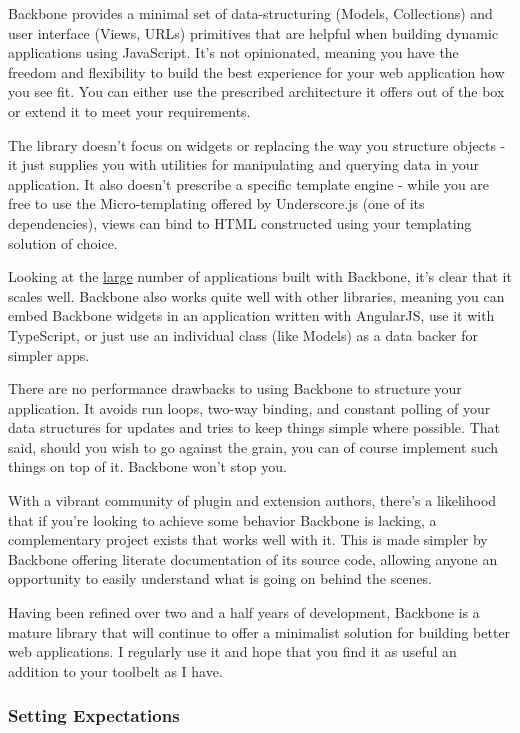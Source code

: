 \documentclass[9pt]{book}
\begin{document}
Backbone provides a minimal set of data-structuring (Models,
Collections) and user interface (Views, URLs) primitives that are
helpful when building dynamic applications using JavaScript. It's not
opinionated, meaning you have the freedom and flexibility to build the
best experience for your web application how you see fit. You can either
use the prescribed architecture it offers out of the box or extend it to
meet your requirements.

The library doesn't focus on widgets or replacing the way you structure
objects - it just supplies you with utilities for manipulating and
querying data in your application. It also doesn't prescribe a specific
template engine - while you are free to use the Micro-templating offered
by Underscore.js (one of its dependencies), views can bind to HTML
constructed using your templating solution of choice.

Looking at the \href{http://backbonejs.org/\#examples}{large} number of
applications built with Backbone, it's clear that it scales well.
Backbone also works quite well with other libraries, meaning you can
embed Backbone widgets in an application written with AngularJS, use it
with TypeScript, or just use an individual class (like Models) as a data
backer for simpler apps.

There are no performance drawbacks to using Backbone to structure your
application. It avoids run loops, two-way binding, and constant polling
of your data structures for updates and tries to keep things simple
where possible. That said, should you wish to go against the grain, you
can of course implement such things on top of it. Backbone won't stop
you.

With a vibrant community of plugin and extension authors, there's a
likelihood that if you're looking to achieve some behavior Backbone is
lacking, a complementary project exists that works well with it. This is
made simpler by Backbone offering literate documentation of its source
code, allowing anyone an opportunity to easily understand what is going
on behind the scenes.

Having been refined over two and a half years of development, Backbone
is a mature library that will continue to offer a minimalist solution
for building better web applications. I regularly use it and hope that
you find it as useful an addition to your toolbelt as I have.

\subsubsection{Setting Expectations}\label{setting-expectations}
\end{document}
